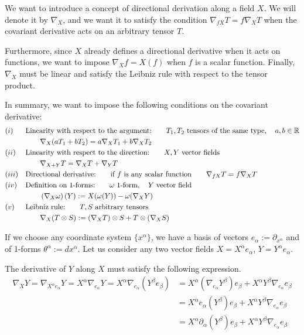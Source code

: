 \begin{points}
\item We want to introduce a concept of directional derivation along a field $X$. We will denote it by $\nabla_X$, and we want it to satisfy the condition $\nabla_{fX}T=f\nabla_XT$ when the covariant derivative acts on an arbitrary tensor $T$.

\item Furthermore, since $X$ already defines a directional derivative when it acts on functions, we want to impose $\nabla_Xf=X(f)$ when $f$ is a scalar function. Finally, $\nabla_X$ must be linear and satisfy the Leibniz rule with respect to the tensor product.

\item In summary, we want to impose the following conditions on the covariant derivative:
\begin{align*}
  &(i)&&\text{Linearity with respect to the argument:}\qquad T_1,T_2\text{ tensors of the same type},\quad a,b\in\mathbb{R}\\
  &&&\qquad\nabla_X(aT_1+bT_2)=a\nabla_XT_1+b\nabla_XT_2\\
  &(ii)&&\text{Linearity with respect to the direction:}\qquad X,Y\text{ vector fields}\\
  &&&\qquad\nabla_{X+Y}T=\nabla_XT+\nabla_YT\\
  &(iii)&&\text{Directional derivative:}\qquad\text{if }f\text{ is any scalar function}\qquad\nabla_{fX}T=f\nabla_XT\\
  &(iv)&&\text{Definition on 1-forms:}\qquad\omega\text{ 1-form},\quad Y\text{ vector field}\\
  &&&\qquad\left(\nabla_X\omega\right)(Y):=X(\omega(Y))-\omega(\nabla_XY)\\
  &(v)&&\text{Leibniz rule:}\qquad T,S\text{ arbitrary tensors}\\
  &&&\qquad\nabla_X(T\otimes S):=(\nabla_XT)\otimes S+T\otimes(\nabla_XS)
\end{align*}

\item If we choose any coordinate system $\{x^\alpha\}$, we have a basis of vectors $e_\alpha:=\partial_{x^\alpha}$ and of 1-forms $\theta^\alpha:=dx^\alpha$. Let us consider any two vector fields $X=X^\alpha e_\alpha$, $Y=Y^\alpha e_\alpha$.

\item The derivative of $Y$ along $X$ must satisfy the following expression.
\begin{align*}
  \nabla_XY=\nabla_{X^\alpha e_\alpha}Y=X^\alpha\nabla_{e_\alpha}Y=X^\alpha\nabla_{e_\alpha}\left(Y^\beta e_\beta\right)&=X^\alpha(\nabla_{e_\alpha}Y^\beta)e_\beta+X^\alpha Y^\beta\nabla_{e_\alpha}e_\beta\\
  &=X^\alpha e_\alpha(Y^\beta)e_\beta+X^\alpha Y^\beta\nabla_{e_\alpha}e_\beta\\
  &=X^\alpha\partial_\alpha(Y^\beta)e_\beta+X^\alpha Y^\beta\nabla_{e_\alpha}e_\beta
\end{align*}


\end{points}
